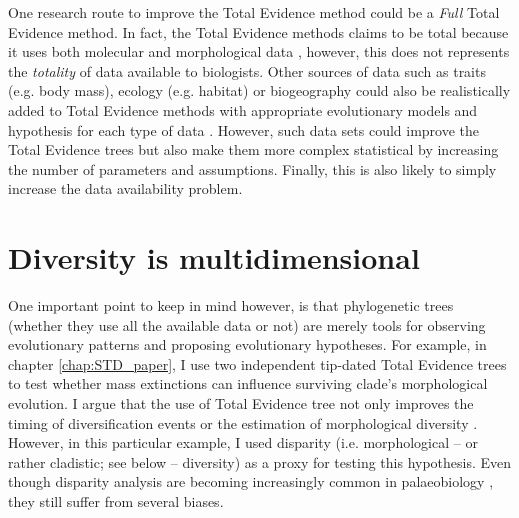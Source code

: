 One research route to improve the Total Evidence method could be a \textit{Full} Total Evidence method.
In fact, the Total Evidence methods claims to be total because it uses both molecular and morphological data \citep{eernissetaxonomic1993}, however, this does not represents the \textit{totality} of data available to biologists.
Other sources of data such as traits (e.g. body mass), ecology (e.g. habitat) or biogeography could also be realistically added to Total Evidence methods with appropriate evolutionary models and hypothesis for each type of data \citep[e.g. respectively quantitative, multiple or geographic state speciation and extinction model - Qua-Mu-GeoSSE models;][]{fitzjohndiversitree2012}.
However, such data sets could improve the Total Evidence trees but also make them more complex statistical by increasing the number of parameters and assumptions.
Finally, this is also likely to simply increase the data availability problem.

\section{Diversity is multidimensional}
One important point to keep in mind however, is that phylogenetic trees (whether they use all the available data or not) are merely tools for observing evolutionary patterns and proposing evolutionary hypotheses.
For example, in chapter \ref{chap:STD_paper}, I use two independent tip-dated Total Evidence trees to test whether mass extinctions can influence surviving clade's morphological evolution.
I argue that the use of Total Evidence tree not only improves the timing of diversification events \citep[][; which is a crucial aspect when studying effect of mass extinctions which are finites points in time]{ronquista2012} or the estimation of morphological diversity \citep[increasing accuracy in reconstructing node's ancestral characters;][]{Finarelli2006}.
However, in this particular example, I used disparity (i.e. morphological -- or rather cladistic; see below -- diversity) as a proxy for testing this hypothesis.
Even though disparity analysis are becoming increasingly common in palaeobiology \citep[e.g.]{Butler2012,brusattedinosaur2012,toljagictriassic-jurassic2013,brusattegradual2014,bensonfaunal2014,Claddis,Close2015}, they still suffer from several biases.

